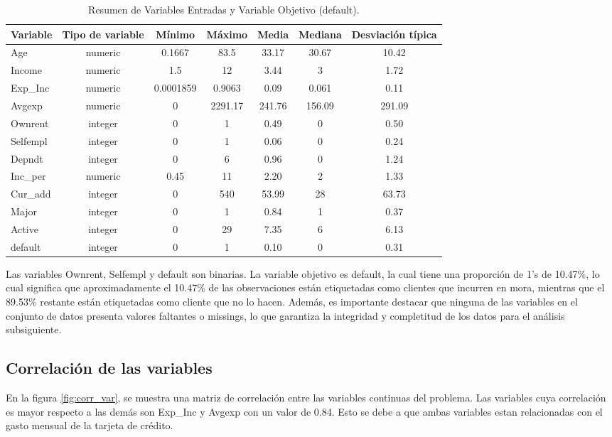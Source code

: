 \documentclass{article}
\begin{document}
\begin{table}[h!]
  \centering
  \caption{Resumen de Variables Entradas y Variable Objetivo (default).}
  \begin{tabular}{@{}lcccccc@{}}
    \toprule
    \textbf{Variable} & \textbf{Tipo de variable} & \textbf{Mínimo} & \textbf{Máximo} & \textbf{Media} & \textbf{Mediana} & \textbf{Desviación típica} \\
    \midrule
    Age & numeric & 0.1667 & 83.5 & 33.17 & 30.67 & 10.42 \\
    Income & numeric & 1.5 & 12 & 3.44 & 3 & 1.72 \\
    Exp\_Inc & numeric & 0.0001859 & 0.9063 & 0.09 & 0.061 & 0.11 \\
    Avgexp & numeric & 0 & 2291.17 & 241.76 & 156.09 & 291.09 \\
    Ownrent & integer & 0 & 1 & 0.49 & 0 & 0.50 \\
    Selfempl & integer & 0 & 1 & 0.06 & 0 & 0.24 \\
    Depndt & integer & 0 & 6 & 0.96 & 0 & 1.24 \\
    Inc\_per & numeric & 0.45 & 11 & 2.20 & 2 & 1.33 \\
    Cur\_add & integer & 0 & 540 & 53.99 & 28 & 63.73 \\
    Major & integer & 0 & 1 & 0.84 & 1 & 0.37 \\
    Active & integer & 0 & 29 & 7.35 & 6 & 6.13 \\
    default & integer & 0 & 1 & 0.10 & 0 & 0.31 \\
    \bottomrule
  \end{tabular}%
  \label{tab:addlabel}%
\end{table}%

Las variables Ownrent, Selfempl y default son binarias. La variable objetivo es default, la cual tiene una proporción de 1's de 10.47\%, lo cual significa que aproximadamente el 10.47\% de las observaciones están etiquetadas como clientes que incurren en mora, mientras que el 89.53\% restante están etiquetadas como cliente que no lo hacen. Además, es importante destacar que ninguna de las variables en el conjunto de datos presenta valores faltantes o missings, lo que garantiza la integridad y completitud de los datos para el análisis subsiguiente.

\subsection{Correlaci\'on de las variables}
En la figura \ref{fig:corr_var}, se muestra una matriz de correlaci\'on entre las variables continuas del problema. Las variables cuya correlaci\'on es mayor respecto a las dem\'as son Exp\_Inc y Avgexp con un valor de 0.84. Esto se debe a que ambas variables estan relacionadas con el gasto mensual de la tarjeta de cr\'edito.
\end{document}
